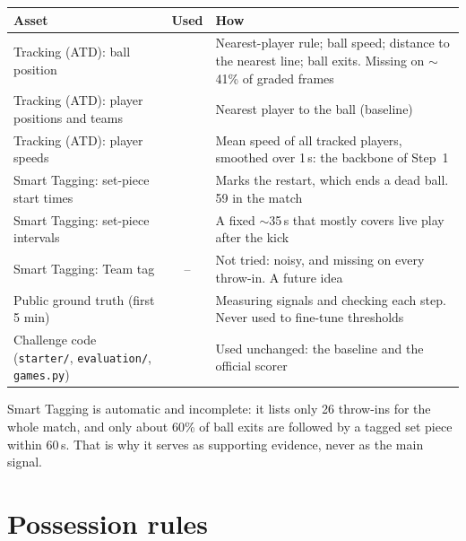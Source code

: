 \documentclass[10pt,a4paper]{article}
\newcommand{\kept}{\textcolor{keep}{\ding{51}}}
\newcommand{\dropped}{\textcolor{drop}{\ding{55}}}
\newcommand{\lbl}[1]{\texttt{#1}}
\begin{document}
\begin{table}[H]
\small
\begin{tabularx}{\linewidth}{@{}p{5.1cm}cY@{}}
\toprule
\textbf{Asset} & \textbf{Used} & \textbf{How} \\
\midrule
Tracking (ATD): ball position & \kept & Nearest-player rule; ball speed; distance to the nearest line; ball exits.
  Missing on $\sim$41\% of graded frames \\
Tracking (ATD): player positions and teams & \kept & Nearest player to the ball (baseline) \\
Tracking (ATD): player speeds & \kept & Mean speed of all tracked players, smoothed over 1\,s: the backbone of Step~1 \\
Smart Tagging: set-piece start times & \kept & Marks the restart, which ends a dead ball. 59 in the match \\
Smart Tagging: set-piece intervals & \dropped & A fixed $\sim$35\,s that mostly covers live play after the kick \\
Smart Tagging: Team tag & -- & Not tried: noisy, and missing on every throw-in. A future idea \\
Public ground truth (first 5 min) & \kept & Measuring signals and checking each step. Never used to fine-tune thresholds \\
Challenge code (\lbl{starter/}, \lbl{evaluation/}, \lbl{games.py}) & \kept & Used unchanged: the baseline and the official scorer \\
\bottomrule
\end{tabularx}
\end{table}

Smart Tagging is automatic and incomplete: it lists only 26 throw-ins for the whole match, and only about 60\%
of ball exits are followed by a tagged set piece within 60\,s. That is why it serves as supporting evidence,
never as the main signal.

\section{Possession rules}
\end{document}
